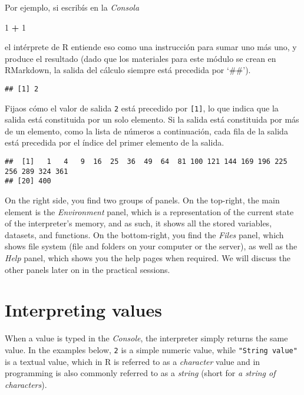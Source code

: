 \documentclass[
]{book}
\newenvironment{Shaded}{\begin{snugshade}}{\end{snugshade}}
\newcommand{\DecValTok}[1]{\textcolor[rgb]{0.00,0.00,0.81}{#1}}
\newcommand{\OperatorTok}[1]{\textcolor[rgb]{0.81,0.36,0.00}{\textbf{#1}}}
\newcommand{\StringTok}[1]{\textcolor[rgb]{0.31,0.60,0.02}{#1}}
\begin{document}
Por ejemplo, si escribís en la \emph{Consola}

\begin{Shaded}
\begin{Highlighting}[]
\DecValTok{1} \OperatorTok{+}\StringTok{ }\DecValTok{1}
\end{Highlighting}
\end{Shaded}

el intérprete de R entiende eso como una instrucción para sumar uno más uno, y produce el resultado (dado que los materiales para este módulo se crean en RMarkdown, la salida del cálculo siempre está precedida por `\#\#').

\begin{verbatim}
## [1] 2
\end{verbatim}

Fijaos cómo el valor de salida \texttt{2} está precedido por \texttt{{[}1{]}}, lo que indica que la salida está constituida por un solo elemento. Si la salida está constituida por más de un elemento, como la lista de números a continuación, cada fila de la salida está precedida por el índice del primer elemento de la salida.

\begin{verbatim}
##  [1]   1   4   9  16  25  36  49  64  81 100 121 144 169 196 225 256 289 324 361
## [20] 400
\end{verbatim}

On the right side, you find two groups of panels. On the top-right, the main element is the \emph{Environment} panel, which is a representation of the current state of the interpreter's memory, and as such, it shows all the stored variables, datasets, and functions. On the bottom-right, you find the \emph{Files} panel, which shows file system (file and folders on your computer or the server), as well as the \emph{Help} panel, which shows you the help pages when required. We will discuss the other panels later on in the practical sessions.

\hypertarget{interpreting-values}{%
\section{Interpreting values}\label{interpreting-values}}

When a value is typed in the \emph{Console}, the interpreter simply returns the same value. In the examples below, \texttt{2} is a simple numeric value, while \texttt{"String\ value"} is a textual value, which in R is referred to as a \emph{character} value and in programming is also commonly referred to as a \emph{string} (short for \emph{a string of characters}).
\end{document}
